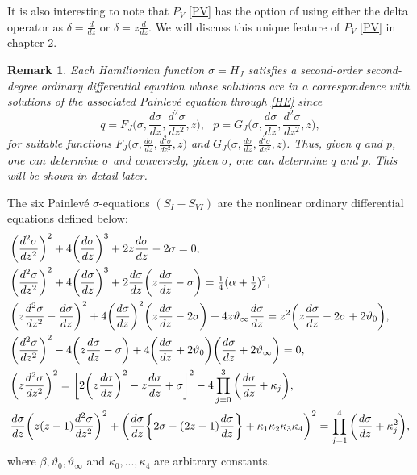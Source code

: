 \documentclass[12pt]{article}
\def\P{Painlev\'e }
\newtheorem{mydef3}{Remark}[section]
\numberwithin{figure}{section}
\numberwithin{equation}{section}
\numberwithin{table}{section}
\begin{document}
It is also interesting to note that $P_{V}$ \eqref{PV} has the option of using either the delta operator as $\delta=\frac{d}{dz}$ or $\delta=z\frac{d}{dz}$. We will discuss this unique feature of $P_{V}$ \eqref{PV} in chapter $2$.
\begin{mydef3}
Each Hamiltonian function $\sigma=H_J$ satisfies a second-order second-degree
ordinary differential equation whose solutions are in a correspondence
with solutions of the associated \P equation through \eqref{HE} since
$$q=F_J\bigg(\sigma,\frac{d\sigma}{dz},\frac{d^2\sigma}{dz^2},z\bigg),~~~p=G_J\bigg(\sigma,\frac{d\sigma}{dz},\frac{d^2\sigma}{dz^2},z\bigg),$$
for suitable functions $F_J\big(\sigma,\frac{d\sigma}{dz},\frac{d^2\sigma}{dz^2},z\big)$ and $G_J\big(\sigma,\frac{d\sigma}{dz},\frac{d^2\sigma}{dz^2},z\big)$. Thus, given $q$ and $p$, one can determine $\sigma$ and conversely, given $\sigma$, one can determine $q$ and $p$. This will be shown in detail later.
\end{mydef3}

The six Painlev\'{e} $\sigma$-equations $(S_I - S_{VI})$ are the nonlinear ordinary differential equations defined below:
\begin{subequations}
\begin{align}
&\bigg(\frac{d^2\sigma}{dz^2}\bigg)^2+4\bigg(\frac{d\sigma}{dz}\bigg)^3+2z\frac{d\sigma}{dz}-2\sigma=0,\label{SI}\\
&\bigg(\frac{d^2\sigma}{dz^2}\bigg)^2+4\bigg(\frac{d\sigma}{dz}\bigg)^3+2\frac{d\sigma}{dz}\bigg(z\frac{d\sigma}{dz}-\sigma\bigg)=\tfrac{1}{4}(\alpha+\tfrac{1}{2})^2,\label{SII}\\
&\bigg(z\frac{d^2\sigma}{dz^2}-\frac{d\sigma}{dz}\bigg)^2+4\bigg(\frac{d\sigma}{dz}\bigg)^2\bigg(z\frac{d\sigma}{dz}-2\sigma\bigg)+4z\vartheta_\infty\frac{d\sigma}{dz}=z^2
\bigg(z\frac{d\sigma}{dz}-2\sigma+2\vartheta_0\bigg),\label{SIII}\\
&\bigg(\frac{d^2\sigma}{dz^2}\bigg)^2-4\bigg(z\frac{d\sigma}{dz}-\sigma\bigg)+4\bigg(\frac{d\sigma}{dz}+2\vartheta_0\bigg)\bigg(\frac{d\sigma}{dz}+2\vartheta_\infty\bigg)=0,\label{SIV}\\
&\bigg(z\frac{d^2\sigma}{dz^2}\bigg)^2=\bigg[2\bigg(z\frac{d\sigma}{dz}\bigg)^2-z\frac{d\sigma}{dz}+\sigma\bigg]^2-4\prod_{j=0}^3\bigg(
\frac{d\sigma}{dz}+\kappa_j\bigg),\label{SV}\\
&\frac{d\sigma}{dz}\bigg(z(z-1)\frac{d^2\sigma}{dz^2}\bigg)^2+\bigg(\frac{d\sigma}{dz}\bigg\{2\sigma-(2z-1)\frac{d\sigma}{dz}\bigg\}+\kappa_1\kappa_2\kappa_3\kappa_4\bigg)^2
=\prod^4_{j=1}\bigg(\frac{d\sigma}{dz}+\kappa_j^2\bigg),\label{SVI}
\end{align}
\end{subequations}
where $\beta,\vartheta_0,\vartheta_\infty$ and $\kappa_0,...,\kappa_4$ are arbitrary constants.
\end{document}
